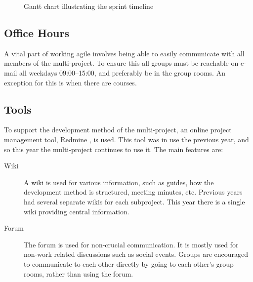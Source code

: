 \begin{figure}[ht]
  \centering
  \caption{\label{fig:gantt_dates} Gantt chart illustrating the sprint timeline}
\end{figure}

\subsection{Office Hours}
A vital part of working agile involves being able to easily communicate with all members of the multi-project. To ensure this all groups must be reachable on e-mail all weekdays 09:00--15:00, and preferably be in the group rooms. An exception for this is when there are courses.

\subsection{Tools}\label{sec:tools}
To support the development method of the multi-project, an online project management tool, Redmine \parencite{redmine-website}, is used. This tool was in use the previous year, and so this year the multi-project continues to use it. The main features are:

\begin{description}
  \item[Wiki] A wiki is used for various information, such as guides, how the development method is structured, meeting minutes, etc. Previous years had several separate wikis for each subproject. This year there is a single wiki providing central information.
  \item[Forum] The forum is used for non-crucial communication. It is mostly used for non-work related discussions such as social events. Groups are encouraged to communicate to each other directly by going to each other's group rooms, rather than using the forum.
\end{description}

